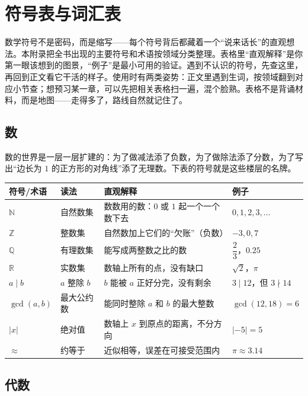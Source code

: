 \chapter{符号表与词汇表}

数学符号不是密码，而是缩写——每个符号背后都藏着一个“说来话长”的直观想法。本附录把全书出现的主要符号和术语按领域分类整理。表格里“直观解释”是你第一眼该想到的图景，“例子”是最小可用的验证。遇到不认识的符号，先查这里，再回到正文看它干活的样子。使用时有两类姿势：正文里遇到生词，按领域翻到对应小节查；想预习某一章，可以先把相关表格扫一遍，混个脸熟。表格不是背诵材料，而是地图——走得多了，路线自然就记住了。

\section{数}

数的世界是一层一层扩建的：为了做减法添了负数，为了做除法添了分数，为了写出“边长为 $1$ 的正方形的对角线”添了无理数。下表的符号就是这些楼层的名牌。

\begin{center}
\begin{tabular}{llp{4.6cm}p{4.6cm}}
\toprule
符号/术语 & 读法 & 直观解释 & 例子 \\
\midrule
$\mathbb{N}$ & 自然数集 & 数数用的数：$0$ 或 $1$ 起一个一个数下去 & $0,1,2,3,\dots$ \\
$\mathbb{Z}$ & 整数集 & 自然数加上它们的“欠账”（负数） & $-3,0,7$ \\
$\mathbb{Q}$ & 有理数集 & 能写成两整数之比的数 & $\dfrac{2}{3}$，$0.25$ \\
$\mathbb{R}$ & 实数集 & 数轴上所有的点，没有缺口 & $\sqrt{2}$，$\pi$ \\
$a\mid b$ & $a$ 整除 $b$ & $b$ 能被 $a$ 正好分完，没有剩余 & $3\mid 12$，但 $3\nmid 14$ \\
$\gcd(a,b)$ & 最大公约数 & 能同时整除 $a$ 和 $b$ 的最大整数 & $\gcd(12,18)=6$ \\
$|x|$ & 绝对值 & 数轴上 $x$ 到原点的距离，不分方向 & $|-5|=5$ \\
$\approx$ & 约等于 & 近似相等，误差在可接受范围内 & $\pi\approx 3.14$ \\
\bottomrule
\end{tabular}
\end{center}

\section{代数}

